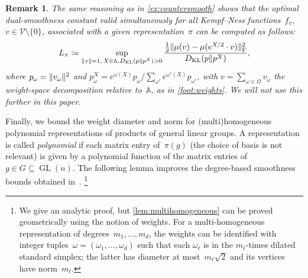 \documentclass[11pt,letterpaper]{article}
\newtheorem{remark}[theorem]{Remark}\AddToHook{env/remark/begin}{\crefalias{theorem}{remark}}
\numberwithin{equation}{section}
\renewcommand{\AA}{\mathbb{A}}
\newcommand{\VV}{\mathcal{V}}
\DeclareMathOperator{\GL}{GL}
\DeclarePairedDelimiter\norm{\lVert}{\rVert}
\begin{document}
\begin{remark}
The same reasoning as in \cref{ex:countersmooth} shows that the optimal dual-smoothness constant valid simultaneously for all Kempf--Ness functions~$f_v$, $v \in \VV \setminus \{0\}$, associated with a given representation~$\pi$ can be computed as follows:
\begin{align*}
    L_\pi \coloneqq \sup_{\norm v = 1, \, X \in \AA, D_{\mathrm{KL}}(p\Vert p^X)>0} \frac {\frac12 \norm{\mu(v) - \mu(e^{X/2} \cdot v)}_{\mathrm F}^2} {D_{\mathrm{KL}}(p\Vert p^X)},
\end{align*}
where $p_\omega = \norm{v_\omega}^2$ and $p_\omega^X = e^{\omega(X)} p_\omega / \sum_{\omega'} e^{\omega'(X)} p_{\omega'}$,
with $v=\sum_{\omega\in\Omega}v_\omega$ the weight-space decomposition relative to~$\AA$, as in \cref{foot:weights}.
We will not use this further in this paper.
\end{remark}

Finally, we bound the weight diameter and norm for (multi)homogeneous polynomial representations of products of general linear groups.
A representation is called \emph{polynomial} if each matrix entry of~$\pi(g)$ (the choice of basis is not relevant) is given by a polynomial function of the matrix entries of~$g \in G \subseteq \GL(n)$.
The following lemma improves the degree-based smoothness bounds obtained in~\cite{BFGOWW2019}.%
\footnote{We give an analytic proof, but \cref{lem:multihomogeneous} can be proved geometrically using the notion of weights.
For a multi-homogeneous representation of degrees~$m_1,\dots,m_d$, the weights can be identified with integer tuples~$\omega=(\omega_1,\dots,\omega_d)$ such that each $\omega_\ell$ is in the $m_\ell$-times dilated standard simplex; the latter has diameter at most~$m_\ell \sqrt{2}$ and its vertices have norm~$m_\ell$.}
\end{document}
